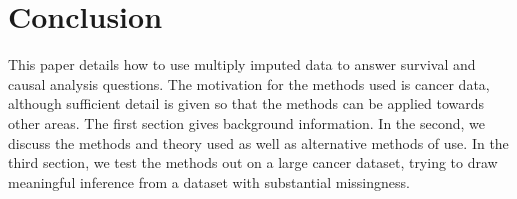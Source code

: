 \chapter{Conclusion}
This paper details how to use multiply imputed data to answer survival and causal analysis questions. The motivation for the methods used is cancer data, although sufficient detail is given so that the methods can be applied towards other areas. The first section gives background information. In the second, we discuss the methods and theory used as well as alternative methods of use. In the third section, we test the methods out on a large cancer dataset, trying to draw meaningful inference from a dataset with substantial missingness.
